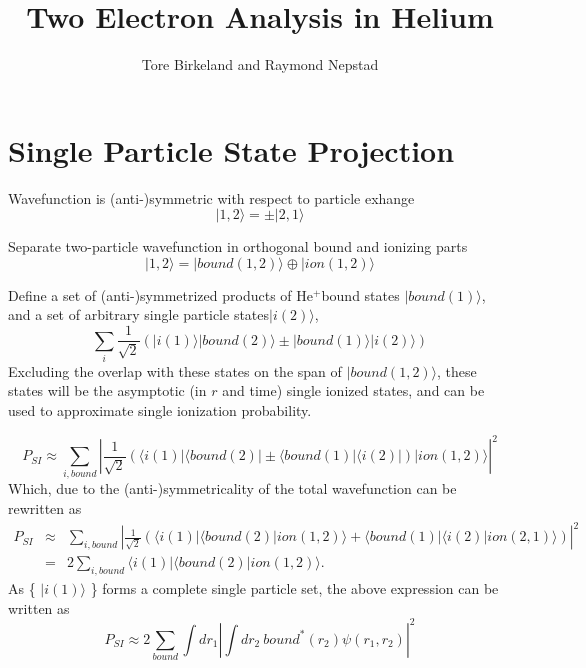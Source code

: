 \documentclass[a4paper,12pt]{paper}
\title{Two Electron Analysis in Helium}
\author{Tore Birkeland and Raymond Nepstad}
\newcommand{\bra}[1]{\ensuremath{\langle #1 |}}
\newcommand{\ket}[1]{\ensuremath{| #1 \rangle}}
\newcommand{\innerprod}[2]{\langle #1 | #2 \rangle}
\newcommand{\Hep}{He$^+$}
\begin{document}
\section{Single Particle State Projection}

Wavefunction is (anti-)symmetric with respect to particle exhange
\begin{equation}
	\ket{1,2} = \pm \ket{2,1}
\end{equation}

Separate two-particle wavefunction in orthogonal bound and ionizing parts
\begin{equation}
	\ket{1,2} = \ket{bound(1,2)} \oplus \ket{ion(1,2)}
\end{equation}

Define a set of (anti-)symmetrized products of \Hep bound states $\ket{bound(1)}$, and a set of arbitrary single particle states\ket{i(2)},
\begin{equation}
	\sum_i \frac{1}{\sqrt{2}} \left( \ket{i(1)}\ket{bound(2)} \pm \ket{bound(1)}\ket{i(2)} \right)
\end{equation}
Excluding the overlap with these states on the span of $\ket{bound(1,2)}$, these states will be the asymptotic (in $r$ and time) single ionized states, and can be used to approximate single ionization probability.

\begin{equation}
	P_{SI} \approx \sum_{i,bound} 
		| \frac{1}{\sqrt{2}} \left( \bra{i(1)}\bra{bound(2)} \pm \bra{bound(1)}\bra{i(2)} \right) 
		\ket{ion(1,2)} |^2
\end{equation}
Which, due to the (anti-)symmetricality of the total wavefunction can be rewritten as
\begin{eqnarray}
	P_{SI} &\approx& \sum_{i,bound} 
		| \frac{1}{\sqrt{2}} \left( \bra{i(1)}\innerprod{bound(2)}{ion(1,2)} + \bra{bound(1)}\innerprod{i(2)}{ion(2,1)} \right) |^2 \\
		&=& 2 \sum_{i, bound} \bra{i(1)}\innerprod{bound(2)}{ion(1,2)}.
\end{eqnarray}
As \{ $\ket{i(1)}$ \} forms a complete single particle set, the above expression can be written as
\begin{equation}
	P_{SI} \approx 2 \sum_{bound} \int dr_1 | \int dr_2 \  bound^*(r_2) \psi(r_1, r_2) |^2 
\end{equation}
\end{document}
